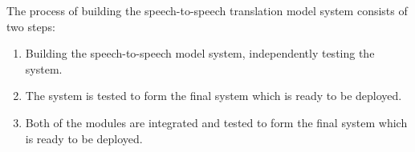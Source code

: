 {\normalsize{The process of building the speech-to-speech translation model system consists of two steps: }}
\begin{enumerate}
    \item Building the speech-to-speech model system, independently testing the system.
    \item The system is tested to form the final system which is ready to be deployed.
    \item Both of the modules are integrated and tested to form the final system which is ready to be deployed.
\end{enumerate}